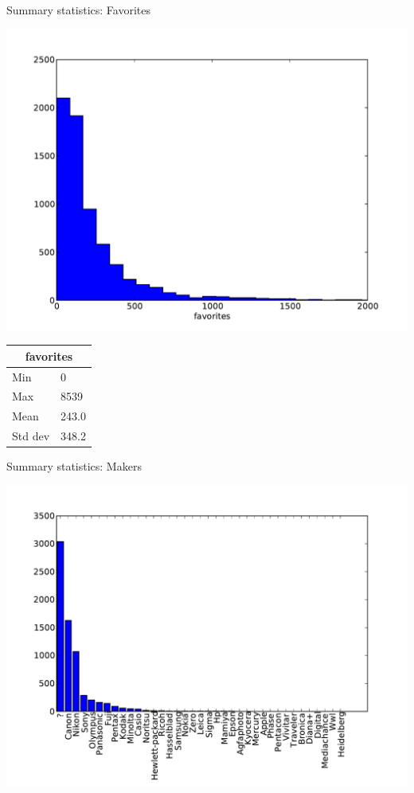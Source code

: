 \documentclass[ignorenonframetext]{beamer}
\begin{document}
\begin{frame}{Summary statistics: Favorites}
\begin{center}
\includegraphics[scale=0.35]{histo_favorites.pdf}
\end{center}
\begin{center}
\begin{tabular}{|l|l|}
\hline\multicolumn{2}{|c|}{favorites} \\
\hline
Min & 0 \\
Max & 8539 \\
Mean & 243.0\\
Std dev & 348.2 \\
\hline
\end{tabular}
\end{center}
\end{frame}

\begin{frame}{Summary statistics: Makers}
\begin{center}
\includegraphics[scale=0.5]{histo_make.pdf}
\end{center}
\end{frame}
\end{document}
